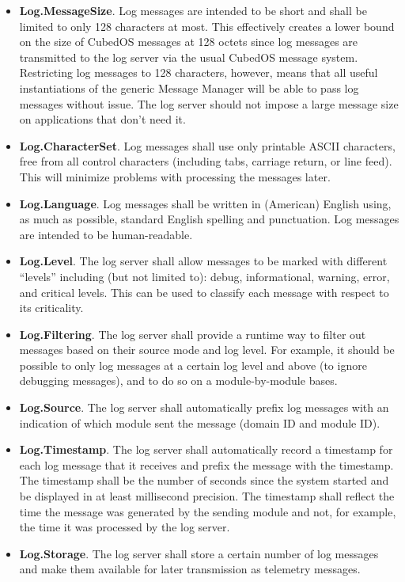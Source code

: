 \begin{itemize}
  \item \textbf{Log.MessageSize}. Log messages are intended to be short and shall be limited to
    only 128 characters at most. This effectively creates a lower bound on the size of CubedOS
    messages at 128 octets since log messages are transmitted to the log server via the usual
    CubedOS message system. Restricting log messages to 128 characters, however, means that all
    useful instantiations of the generic Message Manager will be able to pass log messages
    without issue. The log server should not impose a large message size on applications that
    don't need it.
  \item \textbf{Log.CharacterSet}. Log messages shall use only printable ASCII characters, free
    from all control characters (including tabs, carriage return, or line feed). This will
    minimize problems with processing the messages later.
  \item \textbf{Log.Language}. Log messages shall be written in (American) English using, as
    much as possible, standard English spelling and punctuation. Log messages are intended to be
    human-readable.
  \item \textbf{Log.Level}. The log server shall allow messages to be marked with different
    ``levels'' including (but not limited to): debug, informational, warning, error, and
    critical levels. This can be used to classify each message with respect to its criticality.
  \item \textbf{Log.Filtering}. The log server shall provide a runtime way to filter out
    messages based on their source mode and log level. For example, it should be possible to
    only log messages at a certain log level and above (to ignore debugging messages), and to do
    so on a module-by-module bases.
  \item \textbf{Log.Source}. The log server shall automatically prefix log messages with an
    indication of which module sent the message (domain ID and module ID).
  \item \textbf{Log.Timestamp}. The log server shall automatically record a timestamp for each
    log message that it receives and prefix the message with the timestamp. The timestamp shall
    be the number of seconds since the system started and be displayed in at least millisecond
    precision. The timestamp shall reflect the time the message was generated by the sending
    module and not, for example, the time it was processed by the log server.
  \item \textbf{Log.Storage}. The log server shall store a certain number of log messages and
    make them available for later transmission as telemetry messages. 
\end{itemize}

